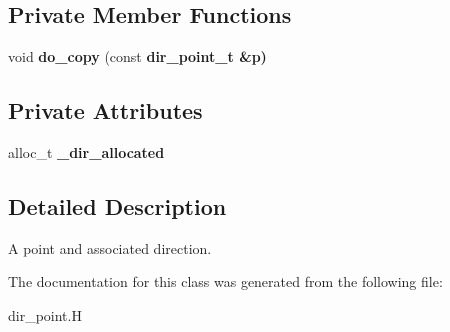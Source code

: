 \subsection*{Private Member Functions}
\begin{CompactItemize}
\item 
void \textbf{do\_\-copy} (const \bf{dir\_\-point\_\-t} \&p)\label{classSimSite3D_1_1dir__point__t_80fca05c410b767d5eff066f3e5708bd}

\end{CompactItemize}
\subsection*{Private Attributes}
\begin{CompactItemize}
\item 
alloc\_\-t \textbf{\_\-dir\_\-allocated}\label{classSimSite3D_1_1dir__point__t_14646e021c9e24eedf8a41ef4f6dc68d}

\end{CompactItemize}


\subsection{Detailed Description}
A point and associated direction. 



The documentation for this class was generated from the following file:\begin{CompactItemize}
\item 
dir\_\-point.H\end{CompactItemize}
